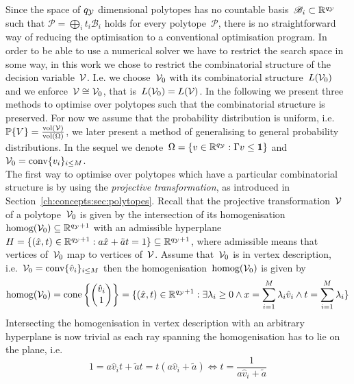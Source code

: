 %
Since the space of $q_\mathcal Y$ dimensional polytopes has no countable basis~$\mathscr B_i\subset\mathbb R^{q_\mathcal Y}$ such that $\mathcal P=\bigoplus_{i} t_i\mathscr B_i$ holds for every polytope~$\mathcal P$, there is no straightforward way of reducing the optimisation to a conventional optimisation program.
%
In order to be able to use a numerical solver we have to restrict the search space in some way, in this work we chose to restrict the combinatorial structure of the decision variable~$\mathcal V$.
%
I.e. we choose~$\mathcal V_0$ with its combinatorial structure~$L(\mathcal V_0)$ and we enforce~$\mathcal V\cong\mathcal V_0$, that is~$L(\mathcal V_0)=L(\mathcal V)$.
%
In the following we present three methods to optimise over polytopes such that the combinatorial structure is preserved.
%
For now we assume that the probability distribution is uniform, i.e.~$\mathbb P\{V\}=\frac{\text{vol}(\mathcal V)}{\text{vol}(\Omega)}$, we later present a method of generalising to general probability distributions.
%
In the sequel we denote~$\Omega = \{v\in\mathbb R^{q_\mathcal Y}:\Gamma v\leq \mathbf{1}\}$ and $\mathcal V_0 = \text{conv}\{v_i\}_{i\leq M}$.
%
\\[1em]
%
\mysplit The first way to optimise over polytopes which have a particular combinatorial structure is by using the \emph{projective transformation}, as introduced in Section~\ref{ch:concepts:sec:polytopes}.
%
Recall that the projective transformation~$\mathcal V$ of a polytope~$\mathcal V_0$ is given by the intersection of its homogenisation~$\text{homog}(\mathcal V_0)\subseteq\mathbb R^{q_\mathcal Y+1}$ with an admissible hyperplane~$H=\{(\hat x,t)\in\mathbb R^{q_\mathcal Y+1}: a\hat x+\tilde a t=1\}\subseteq\mathbb R^{q_\mathcal Y+1}$, where admissible means that vertices of~$\mathcal V_0$ map to vertices of~$\mathcal V$.
%
Assume that~$\mathcal V_0$ is in vertex description, i.e.~$\mathcal V_0=\text{conv}\{\hat v_i\}_{i\leq M}$ then the homogenisation~$\text{homog}(\mathcal V_0)$ is given by
%
\begin{equation}
	\text{homog}(\mathcal V_0) = \text{cone}\left\{\begin{pmatrix}\hat v_i\\ 1\end{pmatrix}\right\} = \{(\hat x,t)\in\mathbb R^{q_\mathcal Y+1}:\exists\lambda_i\geq0\wedge x=\sum_{i=1}^M \lambda_i \hat v_i\wedge t=\sum_{i=1}^M\lambda_i\}
\end{equation}
%
Intersecting the homogenisation in vertex description with an arbitrary hyperplane is now trivial as each ray spanning the homogenisation has to lie on the plane, i.e.
%
\begin{equation}
	1 = a\hat v_it + \tilde a t = t(a\hat v_i + \tilde a) \Leftrightarrow t = \frac{1}{a\hat v_i + \tilde a}
\end{equation}
